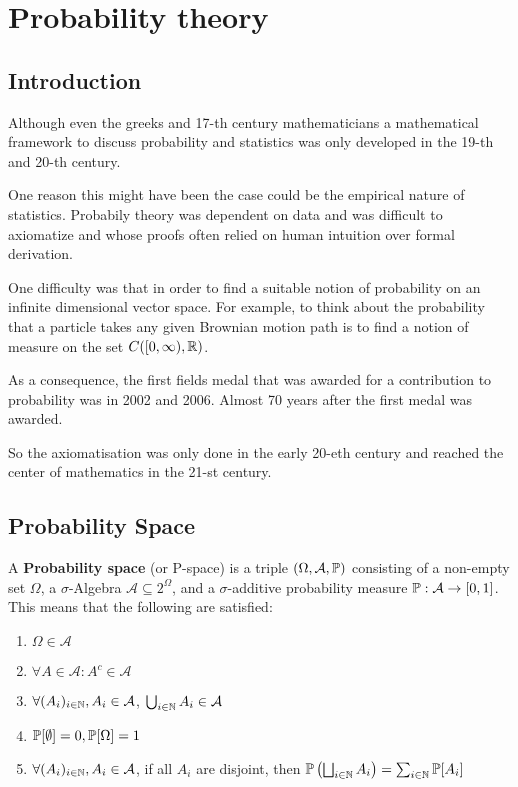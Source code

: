 \section{Probability theory}
\subsection{Introduction}

Although even the greeks and 17-th century mathematicians 
a mathematical framework to discuss probability and statistics was only developed in the 19-th and 20-th century.

One reason this might have been the case could be the empirical nature of statistics. 
Probabily theory was dependent on data and was difficult to axiomatize and whose proofs often relied on human intuition over formal derivation.

One difficulty was that in order to find a suitable notion of probability on an infinite dimensional vector space.
For example, to think about the probability that a particle takes any given Brownian motion path is to find a notion of measure on the set $C([0,\infty), \mathbb{R})$.

As a consequence, the first fields medal that was awarded for a contribution to probability was in 2002 and 2006. Almost 70 years after the first medal was awarded.

So the axiomatisation was only done in the early 20-eth century and reached the center of mathematics in the 21-st century.


\subsection{Probability Space}

\begin{dfn}
  A \textbf{Probability space} (or P-space) is a triple $(\Omega,\mathcal{A}, \mathbb{P})$ consisting of a non-empty set $\Omega$, 
  a $\sigma$-Algebra $\mathcal{A} \subseteq 2^{\Omega}$,
  and a $\sigma$-additive probability measure $\mathbb{P}: \mathcal{A} \to [0,1]$.
  This means that the following are satisfied:
  \begin{enumerate}
    \item $\Omega \in \mathcal{A}$
    \item $\forall A \in \mathcal{A}: A^{c} \in \mathcal{A}$
    \item $\forall (A_i)_{i \in \mathbb{N}}, A_i \in \mathcal{A}$, $\bigcup_{i \in \mathbb{N}} A_i \in \mathcal{A}$
    \item $\mathbb{P}[\emptyset] = 0, \mathbb{P}[\Omega] = 1$
    \item $\forall (A_i)_{i \in \mathbb{N}}, A_i \in \mathcal{A}$, if all $A_i$ are disjoint, then
      $\mathbb{P}\left(\bigsqcup_{i \in \mathbb{N}} A_i\right) = \sum_{i \in \mathbb{N}} \mathbb{P}[A_i]$
  \end{enumerate}
\end{dfn}

